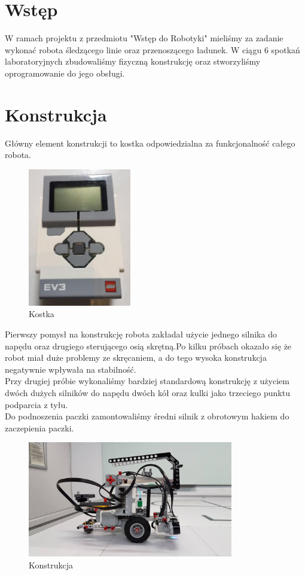 \section{Wstęp}

W ramach projektu z przedmiotu "Wstęp do Robotyki" mieliśmy za zadanie wykonać robota śledzącego linie oraz przenoszącego ładunek. W ciągu 6 spotkań laboratoryjnych zbudowaliśmy fizyczną konstrukcję oraz stworzyliśmy oprogramowanie do jego obsługi.

\section{Konstrukcja}

Główny element konstrukcji to kostka odpowiedzialna za funkcjonalność całego robota.

\begin{figure}[H]
    \centering
    \includegraphics[width=0.4\textwidth]{Images/main}
    \caption[]{Kostka}
\end{figure} 

Pierwszy pomysł na konstrukcję robota zakładał użycie jednego silnika do napędu oraz drugiego sterującego osią skrętną.Po kilku próbach okazało się że robot miał duże problemy ze skręcaniem, a do tego wysoka konstrukcja negatywnie wpływała na stabilność.\\
Przy drugiej próbie wykonaliśmy bardziej standardową konstrukcję z użyciem dwóch dużych silników do napędu dwóch kół oraz kulki jako trzeciego punktu podparcia z tyłu.\\
Do podnoszenia paczki zamontowaliśmy średni silnik z obrotowym hakiem do zaczepienia paczki. 

\begin{figure}[H]
    \centering
    \includegraphics[width=0.8\textwidth]{Images/structure}
    \caption[]{Konstrukcja}
\end{figure} 

